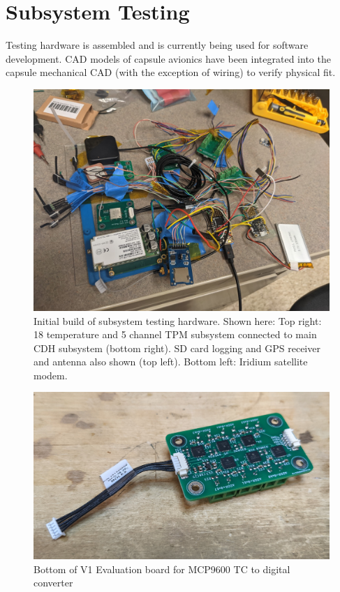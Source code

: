 \documentclass{article}
\begin{document}
\section{Subsystem Testing}
\label{appb}

Testing hardware is assembled and is currently being used for software development. CAD models of capsule avionics have been integrated into the capsule mechanical CAD (with the exception of wiring) to verify physical fit.  

\begin{figure}[h!]
	\includegraphics[width=\textwidth]{images/subsystem-hardware.jpg}
	\caption{Initial build of subsystem testing hardware. Shown here: Top right: 18 temperature and 5 channel TPM subsystem connected to main CDH subsystem (bottom right). SD card logging and GPS receiver and antenna also shown (top left). Bottom left: Iridium satellite modem.}
	\label{fig:subsystem-hardware}
\end{figure}


\begin{figure}[H]
	\centering
	\includegraphics[width=\textwidth]{images/tc-board-bottom}
	\caption{Bottom of V1 Evaluation board for MCP9600 TC to digital converter}
	\label{fig:tc-board-bottom}
\end{figure}
\end{document}
